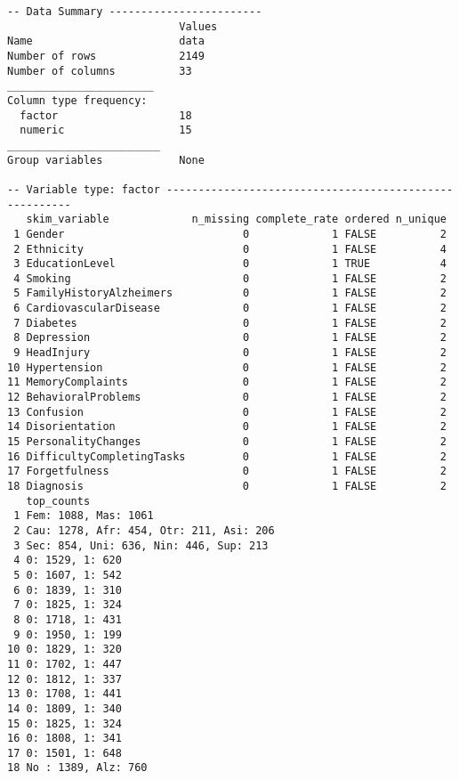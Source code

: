 \documentclass[
  letterpaper,
  DIV=11,
  numbers=noendperiod]{scrartcl}
\begin{document}
\begin{verbatim}
-- Data Summary ------------------------
                           Values
Name                       data  
Number of rows             2149  
Number of columns          33    
_______________________          
Column type frequency:           
  factor                   18    
  numeric                  15    
________________________         
Group variables            None  

-- Variable type: factor -------------------------------------------------------
   skim_variable             n_missing complete_rate ordered n_unique
 1 Gender                            0             1 FALSE          2
 2 Ethnicity                         0             1 FALSE          4
 3 EducationLevel                    0             1 TRUE           4
 4 Smoking                           0             1 FALSE          2
 5 FamilyHistoryAlzheimers           0             1 FALSE          2
 6 CardiovascularDisease             0             1 FALSE          2
 7 Diabetes                          0             1 FALSE          2
 8 Depression                        0             1 FALSE          2
 9 HeadInjury                        0             1 FALSE          2
10 Hypertension                      0             1 FALSE          2
11 MemoryComplaints                  0             1 FALSE          2
12 BehavioralProblems                0             1 FALSE          2
13 Confusion                         0             1 FALSE          2
14 Disorientation                    0             1 FALSE          2
15 PersonalityChanges                0             1 FALSE          2
16 DifficultyCompletingTasks         0             1 FALSE          2
17 Forgetfulness                     0             1 FALSE          2
18 Diagnosis                         0             1 FALSE          2
   top_counts                             
 1 Fem: 1088, Mas: 1061                   
 2 Cau: 1278, Afr: 454, Otr: 211, Asi: 206
 3 Sec: 854, Uni: 636, Nin: 446, Sup: 213 
 4 0: 1529, 1: 620                        
 5 0: 1607, 1: 542                        
 6 0: 1839, 1: 310                        
 7 0: 1825, 1: 324                        
 8 0: 1718, 1: 431                        
 9 0: 1950, 1: 199                        
10 0: 1829, 1: 320                        
11 0: 1702, 1: 447                        
12 0: 1812, 1: 337                        
13 0: 1708, 1: 441                        
14 0: 1809, 1: 340                        
15 0: 1825, 1: 324                        
16 0: 1808, 1: 341                        
17 0: 1501, 1: 648                        
18 No : 1389, Alz: 760                    


\end{verbatim}
\end{document}
